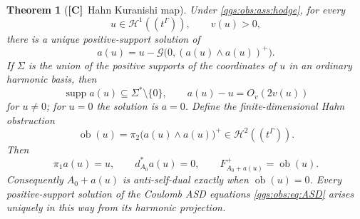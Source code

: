 \documentclass[11pt,oneside]{article}
\numberwithin{equation}{section}
\theoremstyle{plain}
\newtheorem{theorem}{Theorem}[section]
\theoremstyle{definition}
\theoremstyle{remark}
\newcommand{\Green}{\mathcal G}
\newcommand{\ob}{\operatorname{ob}}
\newcommand{\Oval}[1]{O_{v}(#1)}
\DeclareMathOperator{\supp}{supp}
\newcommand{\TC}{\textcolor{TierC}{\textsf{\bfseries[C]}}}
\begin{document}
\begin{theorem}[\TC\ Hahn Kuranishi map]\label{qgs:obs:thm:kuranishi}
Under \cref{qgs:obs:ass:hodge}, for every
\begin{equation}
 u\in\mathcal H^1((t^\Gamma)),\qquad v(u)>0,
\end{equation}
there is a unique positive-support solution of
\begin{equation}\label{qgs:obs:eq:K-fixed}
 a(u)=u-\Green\bigl(0,(a(u)\wedge a(u))^+\bigr).
\end{equation}
If $\Sigma$ is the union of the positive supports of the coordinates of $u$ in an ordinary harmonic basis, then
\begin{equation}\label{qgs:obs:eq:K-support}
 \supp a(u)\subseteq\Sigma^*\setminus\{0\},\qquad
 a(u)-u=\Oval{2v(u)}
\end{equation}
for $u\ne0$; for $u=0$ the solution is $a=0$. Define the finite-dimensional Hahn obstruction
\begin{equation}\label{qgs:obs:eq:kappa}
 \ob(u)=\pi_2\bigl(a(u)\wedge a(u)\bigr)^+
            \in\mathcal H^2((t^\Gamma)).
\end{equation}
Then
\begin{equation}\label{qgs:obs:eq:K-identities}
 \pi_1a(u)=u,\qquad d_{A_0}^*a(u)=0,\qquad
 F_{A_0+a(u)}^+=\ob(u).
\end{equation}
Consequently $A_0+a(u)$ is anti-self-dual exactly when $\ob(u)=0$. Every positive-support solution of the Coulomb ASD equations \eqref{qgs:obs:eq:ASD} arises uniquely in this way from its harmonic projection.
\end{theorem}
\end{document}
